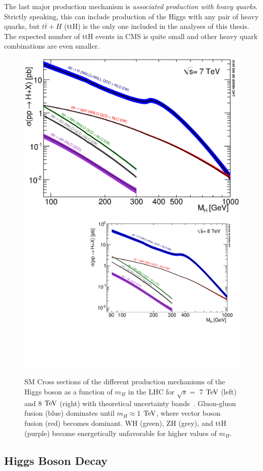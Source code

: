 The last major production mechanism is \textit{associated production with heavy quarks}. Strictly speaking, this can include production of the Higgs with any pair of heavy quarks, but $t\bar{t}+H$ (ttH) is the only one included in the analyses of this thesis. The expected number of ttH events in CMS is quite small and other heavy quark combinations are even smaller.

\begin{figure}[htbp]
\begin{center}
\includegraphics[width=.45\linewidth]{Phenomenology/figures/Higgs_XS_7TeV}
\includegraphics[width=.45\linewidth]{Phenomenology/figures/Higgs_XS_8TeV_lx.pdf}
\caption[Standard Model Production Mechanism of the Higgs at the LHC as a Function of the Higgs' Mass]{SM Cross sections of the different production mechanisms of the Higgs boson as a function of $m_H$ in the LHC for $\sqrt{s}=$ 7 $\rm{TeV}$ (left) and 8 $\rm{TeV}$ (right) with theoretical uncertainty bands~\cite{HXSWG_Properties}. Gluon-gluon fusion (blue) dominates until $m_H \approx 1$ $\rm{TeV}$, where vector boson fusion (red) becomes dominant. WH (green), ZH (grey), and ttH (purple) become energetically unfavorable for higher values of $m_H$.}
\label{fig:HXSWGProduction}
\end{center}
\end{figure}

\subsection{Higgs Boson Decay}
\label{sec:HiggsDecay}

